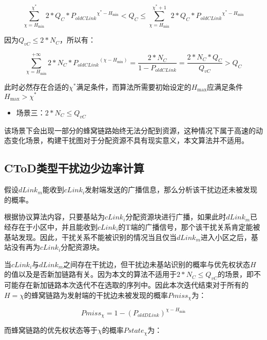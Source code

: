 \documentclass[figurelist,tablelist,algorithmlist,nomlist,masters]{seuthesix}
\begin{document}
	\begin{equation}\label{eq3.1}
	\sum\limits_{\chi = H_{\min }}^{\chi ^*} {2*Q_C*{P_{oldCLink}}^{\chi ^* - H_{\min }}} < Q_C \le \sum\limits_{\chi = H_{\min }}^{\chi ^* + 1} {2*Q_C*{P_{oldCLink}}^{\chi ^* - H_{\min }}}
	\end{equation}

	因为$Q_{vC} \le 2*N_C$，所以有：

	\begin{equation}\label{eq3.1}
	\sum\limits_{\chi = H_{\min }}^{ + \infty } {2*N_C*{P_{oldCLink}}^(\chi - H_{\min })}  = \frac{{2*N_C}}{{1 - {P_{oldCLink}}}} = \frac{{2*N_C*Q_C}}{{Q_{vC}}} > Q_C
	\end{equation}

	此时必然存在合适的$\chi ^*$满足条件，而算法所需要初始设定的$H_{\max }$应满足条件$H_{\max } > \chi ^*$

	\begin{itemize}
		\item 场景三：$2*N_C \le Q_{vC}$
	\end{itemize}

	该场景下会出现一部分的蜂窝链路始终无法分配到资源，这种情况下属于高速的动态变化场景，构建干扰图对于分配资源不具有现实意义，本文算法并不适用。


	\subsection{CToD类型干扰边少边率计算}
	假设$dLink_m$能收到$cLink_i$发射端发送的广播信息，那么分析该干扰边还未被发现的概率。

	根据协议算法内容，只要基站为$cLink_i$分配资源块进行广播，如果此时$dLink_m$已经存在于小区中，并且能收到$cLink_i$的T端的广播信号，那个该干扰关系肯定能被基站发现。因此，干扰关系不能被识别的情况当且仅当$dLink_m$进入小区之后，基站没有再为$cLink_i$分配资源块。

	当$cLink_i$与$dLink_m$之间存在干扰边，但干扰边未基站识别的概率与优先权状态$H$的值以及是否新加链路有关。因为本文的算法不适用于$2*N_C \le Q_{vC}$的场景，即不可能存在新加链路本次迭代不在选取的序列中。因此本次迭代结束对于所有的$H = \chi $的蜂窝链路为发射端的干扰边未被发现的概率$Pmiss_{\chi }$为：

	\begin{equation}\label{eq3.1}
	Pmiss_{\chi } = 1 - {({P_{oldDLink}})^{\chi - H_{\min }}}
	\end{equation}

	而蜂窝链路的优先权状态等于$\chi $的概率$Pstate_{\chi }$为：
\end{document}
